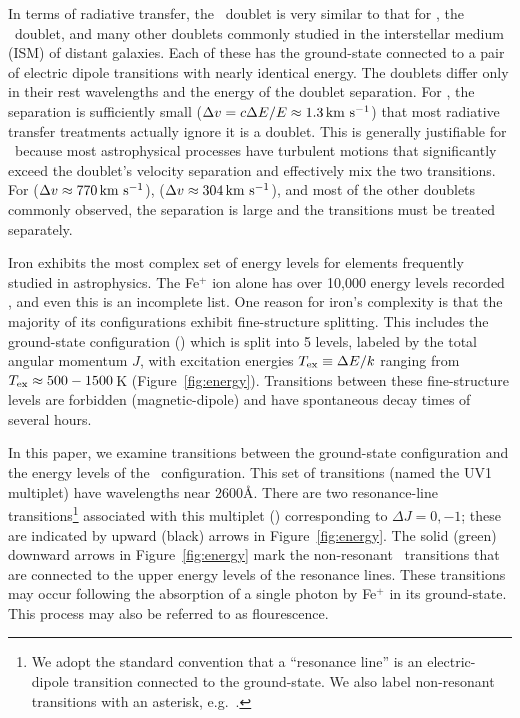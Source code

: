 \documentclass[12pt,preprint]{aastex}
\begin{document}
In terms of radiative transfer, the 
\mgiid\ doublet is very similar to that for 
\lya, the \naid\ doublet, and many other doublets commonly
studied in the interstellar medium (ISM) of distant galaxies.  
Each of these has the ground-state connected to a pair of electric
dipole transitions with nearly identical energy.
The doublets differ only in 
their rest wavelengths and the energy of the doublet separation. 
For  \lya, the
separation is sufficiently small ($\Delta v = c \Delta E / E \approx
1.3 \, {\rm km~s^{-1}}$) that most radiative transfer treatments actually ignore it
is a doublet.
This is generally justifiable for \lya\ because 
most astrophysical processes have turbulent motions that
significantly exceed the doublet's velocity separation and effectively mix the
two transitions.  For  ($\Delta v \approx 770 \, {\rm km~s^{-1}}$),  
 ($\Delta v \approx 304 \, {\rm km~s^{-1}}$), and most of the other doublets
commonly observed, the separation is large and the transitions
must be treated separately.  

Iron exhibits the most complex set of energy levels for elements
frequently studied in astrophysics.  The Fe$^+$ ion alone has over
10,000 energy levels recorded \citep{iron}, and even this is an
incomplete list.  
One reason for iron's complexity is
that the majority of its configurations exhibit fine-structure splitting.
This includes the ground-state configuration (\aconfig) which is split
into 5 levels, 
labeled by the total angular momentum $J$, 
with excitation energies $T_{\rm ex} \equiv \Delta E / k$ ranging from
$T_{\rm ex} \approx 500-1500$\,K (Figure~\ref{fig:energy}).  
Transitions between these fine-structure levels are 
forbidden (magnetic-dipole) and have spontaneous decay times of several hours.  

In this paper, we examine transitions between the ground-state
configuration and the energy levels of the \zconfig\
configuration.  This set of transitions (named the
UV1 multiplet) have wavelengths near 2600\AA.
There are two resonance-line transitions\footnote{We adopt the
  standard convention that a ``resonance line'' is an electric-dipole
  transition connected to the ground-state.  We also label
  non-resonant transitions with an asterisk, e.g.\ \feiic.} 
associated with this multiplet (\feiid)
corresponding to $\Delta J = 0, -1$; these are indicated by upward (black) arrows
in Figure~\ref{fig:energy}. The solid (green) downward
arrows in Figure~\ref{fig:energy} mark the non-resonant \feiis\
transitions that are connected to
the upper energy levels of the resonance lines.  These transitions may
occur following the absorption of a single photon by Fe$^+$ in its
ground-state.   This process may also be referred to as flourescence.
\end{document}

